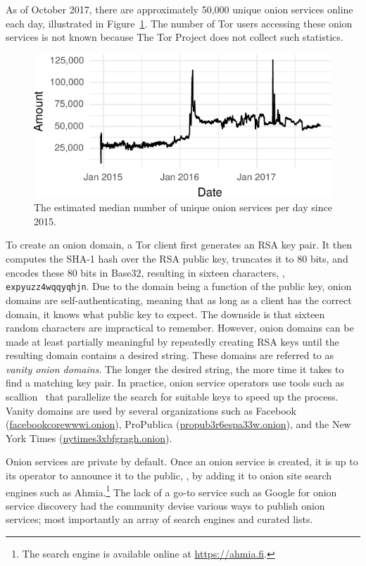 As of October 2017, there are approximately 50,000 unique onion services online
each day, illustrated in Figure~\ref{fig:os-growth}.  The number of Tor users
accessing these onion services is not known because The Tor Project does not
collect such statistics.

\begin{figure}[t]
\includegraphics[width=\linewidth]{figures/os-growth.pdf}
\caption{The estimated median number of unique onion services per day since
2015.}
\label{fig:os-growth}
\end{figure}

To create an onion domain, a Tor client first generates an RSA key pair.  It
then computes the SHA-1 hash over the RSA public key, truncates it to 80 bits,
and encodes these 80 bits in Base32, resulting in sixteen characters, \eg,
\texttt{expyuzz4wqqyqhjn}.  Due to the domain being a function of the public
key, onion domains are self-authenticating, meaning that as long as a client has
the correct domain, it knows what public key to expect.  The downside is that
sixteen random characters are impractical to remember.  However, onion domains
can be made at least partially meaningful by repeatedly creating RSA keys until
the resulting domain contains a desired string.  These domains are referred to
as \emph{vanity onion domains}.  The longer the desired string, the more time it
takes to find a matching key pair.  In practice, onion service operators use
tools such as scallion~\cite{scallion} that parallelize the search for suitable
keys to speed up the process.  Vanity domains are used by several organizations
such as Facebook (\url{facebookcorewwwi.onion}), ProPublica
(\url{propub3r6espa33w.onion}), and the New York Times
(\url{nytimes3xbfgragh.onion}).

Onion services are private by default.  Once an onion service is created, it is
up to its operator to announce it to the public, \eg, by adding it to onion site
search engines such as Ahmia.\footnote{The search engine is available online at
\url{https://ahmia.fi}.}  The lack of a go-to service such as Google for onion
service discovery had the community devise various ways to publish onion
services; most importantly an array of search engines and curated lists.
